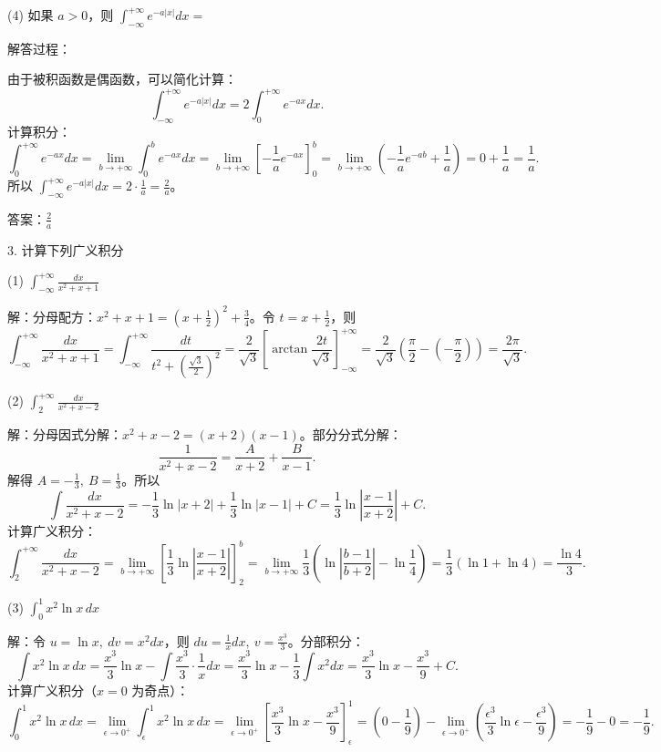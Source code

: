 (4) 如果 \(a>0\)，则 \(\int_{-\infty}^{+\infty}e^{-a|x|}dx=\)

解答过程：

由于被积函数是偶函数，可以简化计算：
\[ \int_{-\infty}^{+\infty}e^{-a|x|}dx=2\int_{0}^{+\infty}e^{-ax}dx. \]
计算积分：
\[ \int_{0}^{+\infty}e^{-ax}dx=\lim_{b\to+\infty}\int_{0}^{b}e^{-ax}dx=\lim_{b\to+\infty}\left[-\frac{1}{a}e^{-ax}\right]_{0}^{b}=\lim_{b\to+\infty}\left(-\frac{1}{a}e^{-ab}+\frac{1}{a}\right)=0+\frac{1}{a}=\frac{1}{a}. \]
所以 \(\int_{-\infty}^{+\infty}e^{-a|x|}dx=2\cdot\frac{1}{a}=\frac{2}{a}\)。

答案：\(\frac{2}{a}\)

3. 计算下列广义积分

(1) \(\int_{-\infty}^{+\infty}\frac{dx}{x^{2}+x+1}\)

解：分母配方：\(x^{2}+x+1=\left(x+\frac{1}{2}\right)^{2}+\frac{3}{4}\)。令 \(t=x+\frac{1}{2}\)，则
\[ \int_{-\infty}^{+\infty}\frac{dx}{x^{2}+x+1}=\int_{-\infty}^{+\infty}\frac{dt}{t^{2}+\left(\frac{\sqrt3}{2}\right)^{2}}=\frac{2}{\sqrt3}\left[\arctan\frac{2t}{\sqrt3}\right]_{-\infty}^{+\infty}=\frac{2}{\sqrt3}\left(\frac{\pi}{2}-\left(-\frac{\pi}{2}\right)\right)=\frac{2\pi}{\sqrt3}. \]

(2) \(\int_{2}^{+\infty}\frac{dx}{x^{2}+x-2}\)

解：分母因式分解：\(x^{2}+x-2=(x+2)(x-1)\)。部分分式分解：
\[ \frac{1}{x^{2}+x-2}=\frac{A}{x+2}+\frac{B}{x-1}. \]
解得 \(A=-\frac{1}{3},\ B=\frac{1}{3}\)。所以
\[ \int\frac{dx}{x^{2}+x-2}=-\frac{1}{3}\ln|x+2|+\frac{1}{3}\ln|x-1|+C=\frac{1}{3}\ln\left|\frac{x-1}{x+2}\right|+C. \]
计算广义积分：
\[ \int_{2}^{+\infty}\frac{dx}{x^{2}+x-2}=\lim_{b\to+\infty}\left[\frac{1}{3}\ln\left|\frac{x-1}{x+2}\right|\right]_{2}^{b}=\lim_{b\to+\infty}\frac{1}{3}\left(\ln\left|\frac{b-1}{b+2}\right|-\ln\frac{1}{4}\right)=\frac{1}{3}(\ln1+\ln4)=\frac{\ln4}{3}. \]

(3) \(\int_{0}^{1}x^{2}\ln x\,dx\)

解：令 \(u=\ln x,\ dv=x^{2}dx\)，则 \(du=\frac{1}{x}dx,\ v=\frac{x^{3}}{3}\)。分部积分：
\[ \int x^{2}\ln x\,dx=\frac{x^{3}}{3}\ln x-\int\frac{x^{3}}{3}\cdot\frac{1}{x}dx=\frac{x^{3}}{3}\ln x-\frac{1}{3}\int x^{2}dx=\frac{x^{3}}{3}\ln x-\frac{x^{3}}{9}+C. \]
计算广义积分（\(x=0\) 为奇点）：
\[ \int_{0}^{1}x^{2}\ln x\,dx=\lim_{\epsilon\to0^{+}}\int_{\epsilon}^{1}x^{2}\ln x\,dx=\lim_{\epsilon\to0^{+}}\left[\frac{x^{3}}{3}\ln x-\frac{x^{3}}{9}\right]_{\epsilon}^{1}=\left(0-\frac{1}{9}\right)-\lim_{\epsilon\to0^{+}}\left(\frac{\epsilon^{3}}{3}\ln\epsilon-\frac{\epsilon^{3}}{9}\right)=-\frac{1}{9}-0=-\frac{1}{9}. \]

